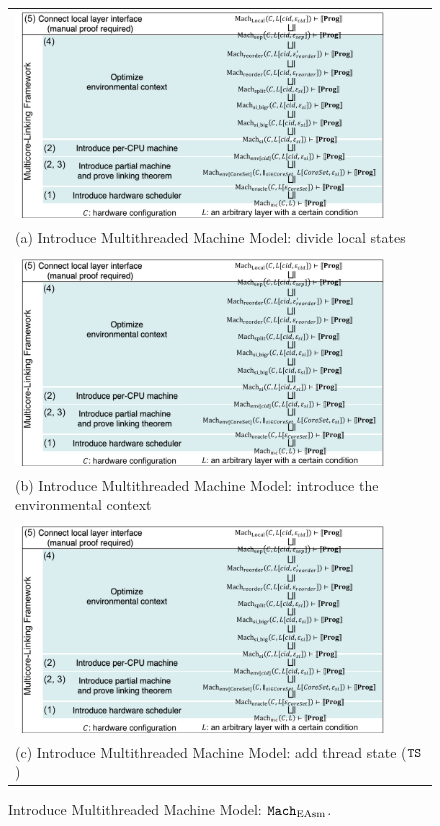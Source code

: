 \begin{figure}
\begin{tabular}{P{0.95\textwidth}}
\includegraphics[width=0.9\textwidth, page=3]{figs/conlink/concurrent_linking}\\
(a) Introduce Multithreaded Machine Model: divide local states\\
\\
\includegraphics[width=0.9\textwidth, page=4]{figs/conlink/concurrent_linking}\\
(b) Introduce Multithreaded Machine Model: introduce the environmental context\\
\\
\includegraphics[width=0.9\textwidth, page=5]{figs/conlink/concurrent_linking}\\
(c) Introduce Multithreaded Machine Model: add thread state (${\mathrm{\texttt{TS}}}$)
\end{tabular}
\caption{Introduce Multithreaded Machine Model: ${\mathrm{\texttt{Mach}}}_{\mathrm{EAsm}}$.}
\label{fig:chapter:conlink:multithreaded-machine-model-easm}
\end{figure}

